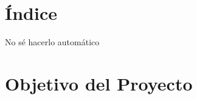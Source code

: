 \section{Índice}
\color{red}No sé hacerlo automático \color{black}

\section{Objetivo del Proyecto}

